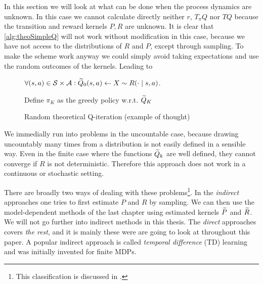 
In this section we will look at what can be done when the process dynamics
are unknown.
In this case we cannot calculate directly neither $r$, $T_\pi Q$ nor
$TQ$ because the transition and reward kernels $P,R$ are unknown.
It is clear that \cref{alg:theoSimpleQ} will not work without
modification in this case, because we have not access to the distributions
of $R$ and $P$, except through sampling.
To make the scheme work anyway we could simply avoid taking expectations
and use the random outcomes of the kernels.
Leading to

\begin{figure}[H]
\begin{algorithm}[H] %
  \caption{Random theoretical Q-iteration (example of thought)}
$\forall (s, a) \in \mathcal{S} \times \mathcal{A} :
\widetilde{Q}_0(s, a) \leftarrow X \sim R(\cdot \mid s, a)$.

Define $\pi_K$ as the greedy policy w.r.t. $\widetilde{Q}_K$ \\
\label{alg:theoRandomQ}
\end{algorithm}
\end{figure}
We immedially run into problems in the uncountable case, because
drawing uncountably many times from a distribution is not easily
defined in a sensible way.
Even in the finite case where the functions $\widetilde{Q}_k$
are well defined, they cannot converge if $R$ is not deterministic.
Therefore this approach does not work in a continuous or
stochastic setting.

There are broadly two ways of dealing with these
problems\footnote{This classification is discussed in .}.
In the \emph{indirect} approaches one tries to first estimate $P$ and $R$
by sampling.
We can then use the model-dependent methods of the last chapter using
estimated kernels $\widetilde{P}$ and $\widetilde{R}$.
We will not go further into indirect methods in this thesis.
The \emph{direct} approaches covers \emph{the rest},
and it is mainly these were are going to look at throughout this
paper. A popular indirect approach is called
\emph{temporal difference} (TD) learning and was initially invented 
for finite MDPs.

